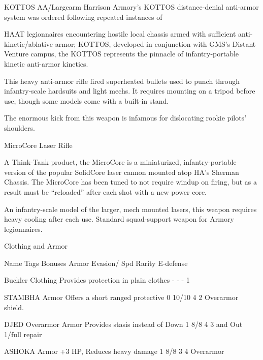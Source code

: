 KOTTOS AA/Largearm  
Harrison Armory’s KOTTOS distance-denial anti-armor system was ordered following repeated instances of  

HAAT legionnaires encountering hostile local chassis armed with sufficient anti-kinetic/ablative armor;  
KOTTOS, developed in conjunction with GMS’s Distant Venture campus, the KOTTOS represents the  
pinnacle of infantry-portable kinetic anti-armor kinetics.    

This heavy anti-armor rifle fired superheated bullets used to punch through infantry-scale hardsuits and  
light mechs. It requires mounting on a tripod before use, though some models come with a built-in stand.  

The enormous kick from this weapon is infamous for dislocating rookie pilots’ shoulders.
 

MicroCore Laser Rifle  

                                                                                                                     


A Think-Tank product, the MicroCore is a miniaturized, infantry-portable version of the popular SolidCore  
laser cannon mounted atop HA’s Sherman Chassis. The MicroCore has been tuned to not require windup  
on firing, but as a result must be “reloaded” after each shot with a new power core.   

An infantry-scale model of the larger, mech mounted lasers, this weapon requires heavy cooling after each  
use. Standard squad-support weapon for Armory legionnaires.
 

                                                 Clothing and Armor  

  Name                  Tags        Bonuses                                    Armor      Evasion/       Spd    Rarity 
                                                                                          E-defense 

 Buckler                Clothing    Provides protection in plain clothes       -          -              -      1 

 STAMBHA               Armor        Offers a short ranged protective            0          10/10          4      2 
  Overarmor                         shield. 

 DJED Overarmor    Armor            Provides stasis instead of Down            1          8/8            4      3 
                                    and Out 1/full repair 

 ASHOKA                Armor        +3 HP, Reduces heavy damage                1          8/8            3      4 
  Overarmor 

